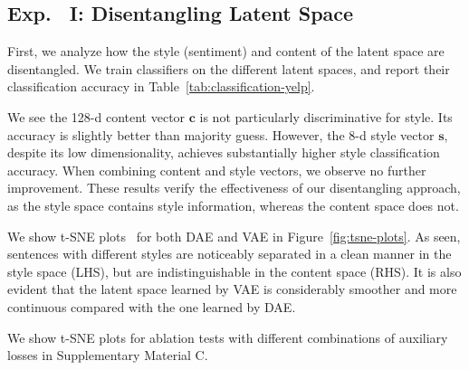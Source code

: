 \documentclass[11pt,a4paper]{article}
\begin{document}
\subsection{Exp.~ I: Disentangling Latent Space}

First, we analyze how the style (sentiment) and content of the latent space are disentangled.
We train classifiers on the different latent spaces, and report their classification accuracy in Table~\ref{tab:classification-yelp}.

We see the 128-d content vector $\bm c$ is not particularly discriminative for style.
Its accuracy is slightly better than majority guess.
However, the 8-d style vector $\bm s$, despite its low dimensionality, achieves substantially higher style classification accuracy.
When combining content and style vectors, we observe no further improvement.
These results verify the effectiveness of our disentangling approach, as the style space contains style information, whereas the content space does not.

We show t-SNE plots~\cite{maaten2008visualizing} for both DAE and VAE in Figure~\ref{fig:tsne-plots}.
As seen, sentences with different styles are noticeably separated in a clean manner in the style space (LHS), but are indistinguishable in the content space (RHS).
It is also evident that the latent space learned by VAE is considerably smoother and more continuous compared with the one learned by DAE.

We show t-SNE plots for ablation tests with different combinations of auxiliary losses in Supplementary Material C.
\end{document}
